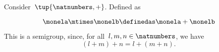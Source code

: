 \begin{example}
  \label{exa:natnum-semigroup}
  Consider~$\tup{\natnumbers,+}$. Defined as

  \begin{equation}
    \label{eq:natnum-semigroup-definition}
    \monela \mtimes \monelb \definedas  \monela + \monelb
\end{equation}


  This is a semigroup, since, for all~$l,m, n \in \natnumbers$, we have
  \begin{equation*}
  (l+m)
    +n
    =l+(m+n).
  \end{equation*}

\end{example}

\begin{comment}

  \begin{equation}
    \label{eq:natnum-product}
    \monela \mtimes \monelb \definedas  \monela \cdot \monelb
\end{equation}
  \begin{equation}
    \label{eq:natnum-min}
    \monela \mtimes \monelb \definedas  \min(\monela, \monelb)
\end{equation}
  \begin{equation}
    \label{eq:natnum-max}
    \monela \mtimes \monelb \definedas  \max(\monela, \monelb)
\end{equation}
\end{comment}


